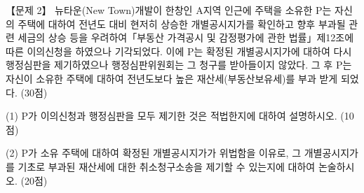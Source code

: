 \begin{longquestion}{【문제 2】}
뉴타운(New Town)개발이 한창인 A지역 인근에 주택을 소유한 P는 자신의 주택에 대하여 전년도 대비 현저히 상승한 개별공시지가를 확인하고 향후 부과될 관련 세금의 상승 등을 우려하여「부동산 가격공시 및 감정평가에 관한 법률」제12조에 따른 이의신청을 하였으나 기각되었다. 이에 P는 확정된 개별공시지가에 대하여 다시 행정심판을 제기하였으나 행정심판위원회는 그 청구를 받아들이지 않았다. 그 후 P는 자신이 소유한 주택에 대하여 전년도보다 높은 재산세(부동산보유세)를 부과 받게 되었다. (30점) \par
\medskip\noindent (1) P가 이의신청과 행정심판을 모두 제기한 것은 적법한지에 대하여 설명하시오. (10점) \par
\medskip\noindent (2) P가 소유 주택에 대하여 확정된 개별공시지가가 위법함을 이유로, 그 개별공시지가를 기초로 부과된 재산세에 대한 취소청구소송을 제기할 수 있는지에 대하여 논술하시오. (20점) \par
\end{longquestion}
